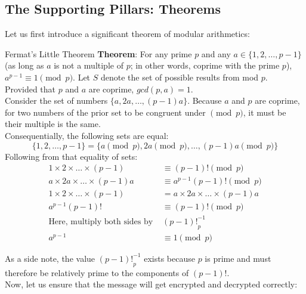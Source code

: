 \subsection{The Supporting Pillars: Theorems}
Let us first introduce a significant theorem of modular arithmetics:
\begin{ln-theorem}{Fermat's Little Theorem}{}
    \textbf{Theorem}: For any prime $p$ and any $a \in \{1, 2, \dots, p - 1\}$ (as long as $a$ is not a multiple of $p$; in other words, coprime with the prime $p$), $a^{p - 1} \equiv 1\pmod{p}$.
    \tcblower
    Let $S$ denote the set of possible results from mod $p$. \\
    Provided that $p$ and $a$ are coprime, $gcd(p,a) = 1$. \\
    Consider the set of numbers $\{a, 2a, \dots, (p - 1)a\}$. Because $a$ and $p$ are coprime, for two numbers of the prior set to be congruent under $\pmod{p}$, it must be their multiple is the same. \\
    Consequentially, the following sets are equal:
    \[
        \{1, 2, \dots, p - 1\} = \{a\pmod{p}, 2a\pmod{p}, \dots, (p-1)a\pmod{p}\}
    \]
    Following from that equality of sets:
    \begin{align*}
        1 \times 2 \times \dots \times (p - 1) &\equiv (p - 1)!\pmod{p} \\
        a \times 2a \times \dots \times (p - 1)a &\equiv a^{p - 1}(p - 1)!\pmod{p} \\
        1 \times 2 \times \dots \times (p - 1) &= a \times 2a \times \dots \times (p - 1)a \\
        a^{p - 1}(p - 1)! &\equiv (p - 1)!\pmod{p} \\
        \text{Here, multiply both sides by } &{(p - 1)!}_{p}^{-1} \\
        a^{p - 1} &\equiv 1\pmod{p}
    \end{align*}
\end{ln-theorem}
As a side note, the value ${(p - 1)!}_{p}^{-1}$ exists because $p$ is prime and must therefore be relatively prime to the components of $(p - 1)!$. \\
Now, let us ensure that the message will get encrypted and decrypted correctly:
